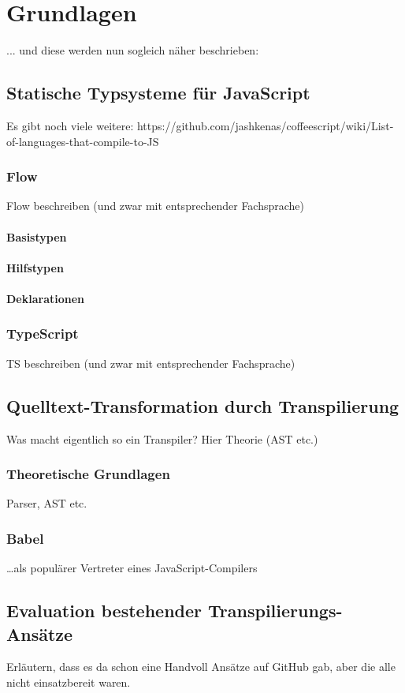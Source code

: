 \chapter{Grundlagen}

... und diese werden nun sogleich näher beschrieben:

\section{Statische Typsysteme für JavaScript}

  Es gibt noch viele weitere: https://github.com/jashkenas/coffeescript/wiki/List-of-languages-that-compile-to-JS

  \subsection{Flow}
    Flow beschreiben (und zwar mit entsprechender Fachsprache)

    \subsubsection{Basistypen}
    \subsubsection{Hilfstypen}
    \subsubsection{Deklarationen}

  \subsection{TypeScript}
    TS beschreiben (und zwar mit entsprechender Fachsprache)

\section{Quelltext-Transformation durch Transpilierung}

  Was macht eigentlich so ein Transpiler? Hier Theorie (AST etc.)

  \subsection{Theoretische Grundlagen}

    Parser, AST etc.


  \subsection{Babel}

    \dots als populärer Vertreter eines JavaScript-Compilers

\section{Evaluation bestehender Transpilierungs-Ansätze}

  Erläutern, dass es da schon eine Handvoll Ansätze auf GitHub gab, aber die alle nicht einsatzbereit waren.
